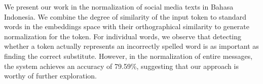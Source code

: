 We present our work in the normalization of social media texts in Bahasa Indonesia. We combine the degree of similarity of the input token to standard words in the embeddings space with their orthographical similarity to generate normalization for the token. For individual words, we observe that detecting whether a token actually represents an incorrectly spelled word is as important as finding the correct substitute. However, in the normalization of entire messages, the system achieves an accuracy of 79.59\%, suggesting that our approach is worthy of further exploration.
